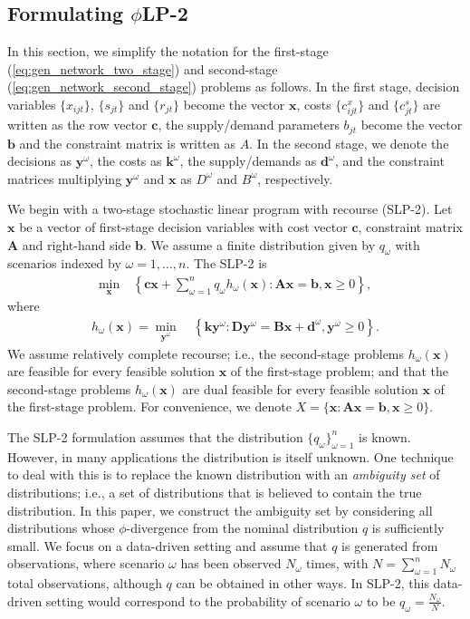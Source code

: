 \documentclass[opre,nonblindrev]{informs3} %
\newcommand{\x}{\mathbf{x}}
\newcommand{\y}{\mathbf{y}}
\renewcommand{\c}{\mathbf{c}}
\newcommand{\A}{\mathbf{A}}
\renewcommand{\b}{\mathbf{b}}
\renewcommand{\k}{\mathbf{k}}
\newcommand{\D}{\mathbf{D}}
\newcommand{\B}{\mathbf{B}}
\renewcommand{\d}{\mathbf{d}}
\newcommand{\plp}{$\phi$LP-2}
\begin{document}
\subsection{Formulating \plp}
\label{ssec:form}

In this section, we simplify the notation for the first-stage (\ref{eq:gen_network_two_stage}) and second-stage (\ref{eq:gen_network_second_stage}) problems as follows.
In the first stage, decision variables $\{x_{ijt}\}$, $\{s_{jt}\}$ and $\{r_{jt}\}$ become the vector $\x$, costs $\{c_{ijt}^x\}$ and $\{c_{jt}^s\}$ are written as the row vector $\c$, the supply/demand parameters $b_{jt}$ become the vector $\b$ and the constraint matrix is written as $A$.
In the second stage, we denote the decisions as $\y^\omega$, the costs as $\k^\omega$, the supply/demands as $\d^\omega$, and the constraint matrices multiplying $\y^\omega$ and $\x$ as $D^\omega$ and $B^\omega$, respectively.

We begin with a two-stage stochastic linear program with recourse (SLP-2).
Let $\x$ be a vector of first-stage decision variables with cost vector $\c$, constraint matrix $\A$ and right-hand side $\b$.
We assume a finite distribution given by $q_\omega$ with scenarios indexed by $\omega = 1, \dots, n$.
The SLP-2 is
\begin{align}
	\min_\x \ & \left\{ \c\x + \sum_{\omega=1}^n q_\omega h_\omega(\x) : \A\x = \b, \x \geq 0 \right\}, \label{eq:slp_first_stage}
\end{align}
where
\begin{align}
	h_\omega(\x) = \min_{\y^\omega} \ & \left\{ \k \y^\omega : \D \y^\omega = \B \x + \d^\omega, \y^\omega \geq 0 \right\}. \label{eq:slp_second_stage}
\end{align}
We assume relatively complete recourse; i.e., the second-stage problems $h_\omega(\x)$ are feasible for every feasible solution $\x$ of the first-stage problem; and that the second-stage problems $h_\omega(\x)$ are dual feasible for every feasible solution $\x$ of the first-stage problem.
For convenience, we denote $X = \{\x : \A\x = \b, \x \geq 0\}$.

The SLP-2 formulation assumes that the distribution $\{q_\omega\}_{\omega=1}^n$ is known.
However, in many applications the distribution is itself unknown.
One technique to deal with this is to replace the known distribution with an {\it ambiguity set} of distributions; i.e., a set of distributions that is believed to contain the true distribution.
In this paper, we construct the ambiguity set by considering all distributions whose $\phi$-divergence from the nominal distribution $q$ is sufficiently small.
We focus on a data-driven setting and assume that $q$ is generated from observations, where scenario $\omega$ has been observed $N_\omega$ times, with $N = \sum_{\omega=1}^n N_\omega$ total observations, although $q$ can be obtained in other ways.
In SLP-2, this data-driven setting would correspond to the probability of scenario $\omega$ to be $q_\omega = \frac{N_\omega}{N}$.
\end{document}
